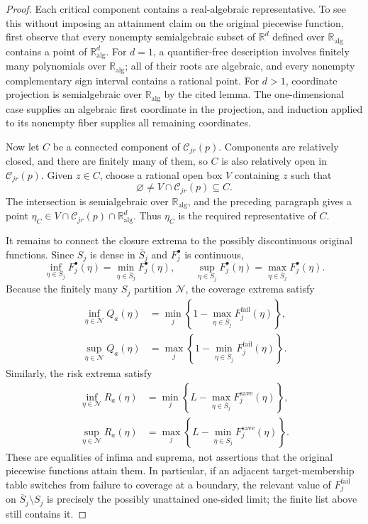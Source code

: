 \documentclass{article}
\begin{document}
\begin{proof}
Each critical component contains a real-algebraic representative.  To see this without imposing an attainment claim on the original piecewise function, first observe that every nonempty semialgebraic subset of \(\mathbb R^d\) defined over \(\mathbb R_{\mathrm{alg}}\) contains a point of \(\mathbb R_{\mathrm{alg}}^d\).  For \(d=1\), a quantifier-free description involves finitely many polynomials over \(\mathbb R_{\mathrm{alg}}\); all of their roots are algebraic, and every nonempty complementary sign interval contains a rational point.  For \(d>1\), coordinate projection is semialgebraic over \(\mathbb R_{\mathrm{alg}}\) by the cited lemma.  The one-dimensional case supplies an algebraic first coordinate in the projection, and induction applied to its nonempty fiber supplies all remaining coordinates.

Now let \(C\) be a connected component of \(\mathcal C_{jr}(p)\).  Components are relatively closed, and there are finitely many of them, so \(C\) is also relatively open in \(\mathcal C_{jr}(p)\).  Given \(z\in C\), choose a rational open box \(V\) containing \(z\) such that
\[
 \varnothing\ne V\cap\mathcal C_{jr}(p)\subseteq C.
\]
The intersection is semialgebraic over \(\mathbb R_{\mathrm{alg}}\), and the preceding paragraph gives a point \(\eta_C\in V\cap\mathcal C_{jr}(p)\cap\mathbb R_{\mathrm{alg}}^d\).  Thus \(\eta_C\) is the required representative of \(C\).

It remains to connect the closure extrema to the possibly discontinuous original functions.  Since \(S_j\) is dense in \(\overline S_j\) and \(F_j^\bullet\) is continuous,
\[
 \inf_{\eta\in S_j}F_j^\bullet(\eta)
 =\min_{\eta\in\overline S_j}F_j^\bullet(\eta),
 \qquad
 \sup_{\eta\in S_j}F_j^\bullet(\eta)
 =\max_{\eta\in\overline S_j}F_j^\bullet(\eta).
\]
Because the finitely many \(S_j\) partition \(\mathcal N\), the coverage extrema satisfy
\[
\begin{aligned}
\inf_{\eta\in\mathcal N}Q_a(\eta)
 &=\min_j\left\{1-
       \max_{\eta\in\overline S_j}F_j^{\mathrm{fail}}(\eta)\right\},\\
\sup_{\eta\in\mathcal N}Q_a(\eta)
 &=\max_j\left\{1-
       \min_{\eta\in\overline S_j}F_j^{\mathrm{fail}}(\eta)\right\}.
\end{aligned}
\]
Similarly, the risk extrema satisfy
\[
\begin{aligned}
\inf_{\eta\in\mathcal N}R_a(\eta)
 &=\min_j\left\{L-
       \max_{\eta\in\overline S_j}F_j^{\mathrm{save}}(\eta)\right\},\\
\sup_{\eta\in\mathcal N}R_a(\eta)
 &=\max_j\left\{L-
       \min_{\eta\in\overline S_j}F_j^{\mathrm{save}}(\eta)\right\}.
\end{aligned}
\]
These are equalities of infima and suprema, not assertions that the original piecewise functions attain them.  In particular, if an adjacent target-membership table switches from failure to coverage at a boundary, the relevant value of \(F_j^{\mathrm{fail}}\) on \(\overline S_j\setminus S_j\) is precisely the possibly unattained one-sided limit; the finite list above still contains it.


\end{proof}
\end{document}
